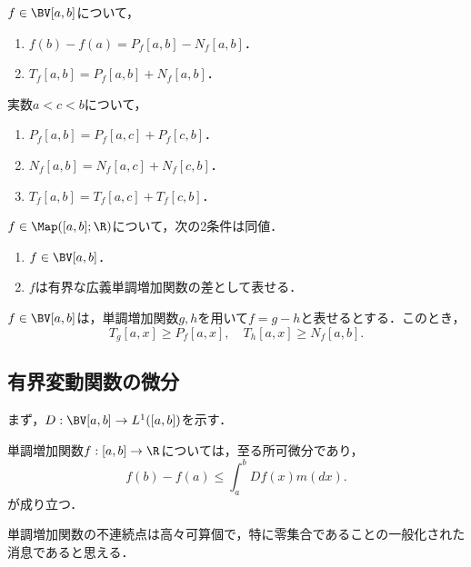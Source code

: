 \documentclass[uplatex, dvipdfmx]{jsreport}
\begin{document}
\begin{proposition}
    $f\in\BV[a,b]$について，
    \begin{enumerate}
        \item $f(b)-f(a)=P_f[a,b]-N_f[a,b]$．
        \item $T_f[a,b]=P_f[a,b]+N_f[a,b]$．
    \end{enumerate}
\end{proposition}

\begin{proposition}
    実数$a<c<b$について，
    \begin{enumerate}
        \item $P_f[a,b]=P_f[a,c]+P_f[c,b]$．
        \item $N_f[a,b]=N_f[a,c]+N_f[c,b]$．
        \item $T_f[a,b]=T_f[a,c]+T_f[c,b]$．
    \end{enumerate}
\end{proposition}

\begin{corollary}[有界変動関数の特徴付け]
    $f\in\Map([a,b];\R)$について，次の2条件は同値．
    \begin{enumerate}
        \item $f\in\BV[a,b]$．
        \item $f$は有界な広義単調増加関数の差として表せる．
    \end{enumerate}
\end{corollary}

\begin{corollary}
    $f\in\BV[a,b]$は，単調増加関数$g,h$を用いて$f=g-h$と表せるとする．このとき，
    \[T_g[a,x]\ge P_f[a,x],\quad T_h[a,x]\ge N_f[a,b].\]
\end{corollary}

\subsection{有界変動関数の微分}

\begin{tcolorbox}[colframe=ForestGreen, colback=ForestGreen!10!white,breakable,colbacktitle=ForestGreen!40!white,coltitle=black,fonttitle=\bfseries\sffamily,
    title=]
    まず，$D:\BV[a,b]\to L^1([a,b])$を示す．
\end{tcolorbox}

\begin{theorem*}
    単調増加関数$f:[a,b]\to\R$については，至る所可微分であり，
    \[f(b)-f(a)\le\int^b_aDf(x)m(dx).\]
    が成り立つ．
\end{theorem*}
\begin{remarks}
    単調増加関数の不連続点は高々可算個で，特に零集合であることの一般化された消息であると思える．
\end{remarks}
\end{document}
